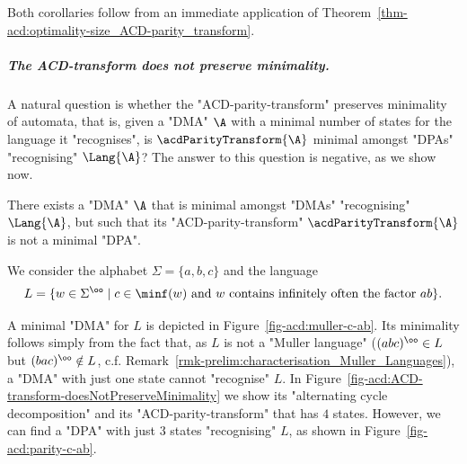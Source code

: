 \documentclass[10pt,a4paper]{amsart}
\renewcommand{\SS}{\Sigma}
\newcommand{\tand}{\text{ and }}
\begin{document}
Both corollaries follow from an immediate application of Theorem~\ref{thm-acd:optimality-size_ACD-parity_transform}.


\subparagraph*{The ACD-transform does not preserve minimality.}

A natural question is whether the "ACD-parity-transform" preserves minimality of automata, that is, given a "DMA" $\A$ with a minimal number of states for the language it "recognises", is $\acdParityTransform{\A}$ minimal amongst "DPAs" "recognising" $\Lang{\A}$?\footnotemark{} The answer to this question is negative, as we show now. %

\begin{proposition}
	There exists a "DMA" $\A$ that is minimal amongst "DMAs" "recognising" $\Lang{\A}$, but such that its "ACD-parity-transform" $\acdParityTransform{\A}$ is not a minimal "DPA".
\end{proposition}

We consider the alphabet $\SS=\{a,b,c\}$ and the language 
\[ L = \{ w\in \SS^\oo \mid c\in \minf(w) \tand w \text{ contains infinitely often the factor } ab\}. \]

A minimal "DMA" for $L$ is depicted in Figure~\ref{fig-acd:muller-c-ab}. Its minimality follows simply from the fact that, as $L$ is not a "Muller language" ($(abc)^\oo\in L$ but $(bac)^\oo\notin L$, c.f. Remark~\ref{rmk-prelim:characterisation_Muller_Languages}), a "DMA" with just one state cannot "recognise" $L$. In Figure~\ref{fig-acd:ACD-transform-doesNotPreserveMinimality} we show its "alternating cycle decomposition" and its "ACD-parity-transform" that has $4$ states. However, we can find a "DPA" with just $3$ states "recognising" $L$, as shown in Figure~\ref{fig-acd:parity-c-ab}.
\end{document}
